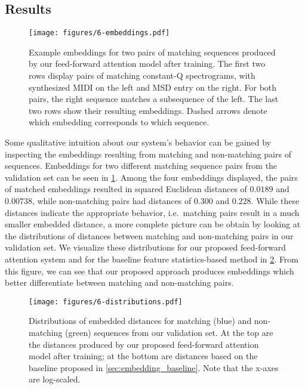 \subsection{Results}

\begin{figure}
  \texttt{[image: figures/6-embeddings.pdf]}
  \caption[Example embeddings for two pairs of sequences]{Example embeddings for two pairs of matching sequences produced by our feed-forward attention model after training.
The first two rows display pairs of matching constant-Q spectrograms, with synthesized MIDI on the left and MSD entry on the right.
For both pairs, the right sequence matches a subsequence of the left.
The last two rows show their resulting embeddings.
Dashed arrows denote which embedding corresponds to which sequence.}
  \label{fig:embeddings}
\end{figure}

Some qualitative intuition about our system's behavior can be gained by inspecting the embeddings resulting from matching and non-matching pairs of sequences.
Embeddings for two different matching sequence pairs from the validation set can be seen in \cref{fig:embeddings}.
Among the four embeddings displayed, the pairs of matched embeddings resulted in squared Euclidean distances of $0.0189$ and $0.00738$, while non-matching pairs had distances of $0.300$ and $0.228$.
While these distances indicate the appropriate behavior, i.e.\ matching pairs result in a much smaller embedded distance, a more complete picture can be obtain by looking at the distributions of distances between matching and non-matching pairs in our validation set.
We visualize these distributions for our proposed feed-forward attention system and for the baseline feature statistics-based method in \cref{fig:embedding_distributions}.
From this figure, we can see that our proposed approach produces embeddings which better differentiate between matching and non-matching pairs.

\begin{figure}
  \texttt{[image: figures/6-distributions.pdf]}
  \caption[Distributions of matching and non-matching distances]{Distributions of embedded distances for matching (blue) and non-matching (green) sequences from our validation set.
At the top are the distances produced by our proposed feed-forward attention model after training; at the bottom are distances based on the baseline proposed in \cref{sec:embedding_baseline}.
Note that the x-axes are log-scaled.}
  \label{fig:embedding_distributions}
\end{figure}

